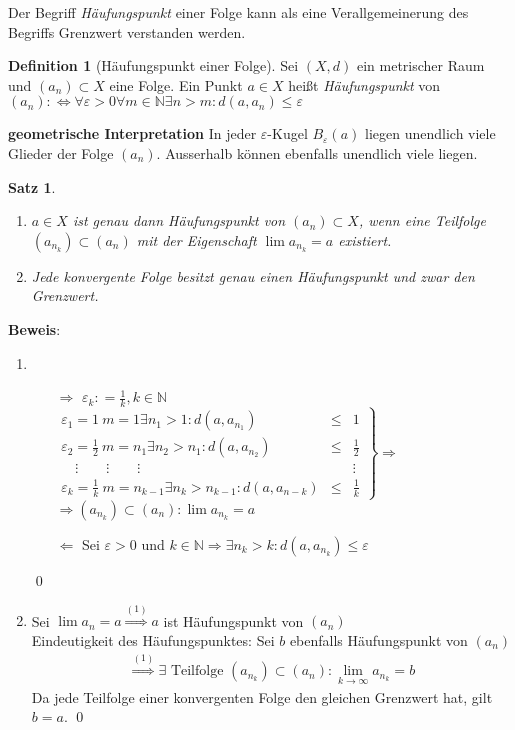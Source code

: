 \documentclass[ngerman,titlepage,twoside, parskip=half*]{scrreprt}
\newcommand*{\N}{\mathbb{N}}
\newcommand*{\perdef}{:\Leftrightarrow}
\theoremstyle{plain}
\newtheorem{theorem}{Satz}[section]
\theoremstyle{definition}
\newtheorem{definition}{Definition}
\theoremstyle{remark}
\newcommand*{\coloneqq}{\mathrel{\mathop:}=}
\begin{document}
Der Begriff \emph{Häufungspunkt} einer Folge kann
als eine Verallgemeinerung des Begriffs Grenzwert verstanden werden.

\begin{definition}[Häufungspunkt einer Folge]
  Sei $(X,d)$ ein metrischer Raum und $(a_n) \subset X$ eine
  Folge. Ein Punkt $a \in X$ heißt
  \emph{Häufungspunkt} von $(a_n)
  \perdef \forall \varepsilon > 0 \forall m \in \N
  \exists n>m\colon d(a,a_n) \leq \varepsilon$
\end{definition}

\textbf{geometrische Interpretation} In jeder $\varepsilon$-Kugel
$B_\varepsilon (a)$ liegen unendlich viele Glieder der Folge
$(a_n)$. Ausserhalb können ebenfalls unendlich viele liegen.

\begin{theorem}
\label{satz:hp}
\begin{enumerate}
\item $a\in X$ ist genau dann Häufungspunkt von $(a_n) \subset X$,
  wenn eine Teilfolge $(a_{n_k})\subset (a_n)$ mit der Eigenschaft
  $\lim a_{n_k}=a$ existiert.
\item Jede konvergente Folge besitzt genau einen Häufungspunkt und
  zwar den Grenzwert.
\end{enumerate}
\end{theorem}

\textbf{Beweis}:
\begin{enumerate}
  \item
    \begin{itemize}
      \item[$\Rightarrow$] $\varepsilon_k\coloneqq\frac{1}{k}, k \in \N$\\
        $\left.
	\begin{array}{lll}
	  \varepsilon_1=1\ m=1 \exists n_1>1\colon d(a,a_{n_1}) & \leq & 1\\
	  \varepsilon_2=\frac{1}{2}\ m = n_1 \exists n_2 >n_1\colon
	  d(a,a_{n_2}) & \leq & \frac{1}{2}\\
	  \quad \vdots \qquad \vdots \qquad \vdots & & \vdots\\
	  \varepsilon_k=\frac{1}{k}\ m=n_{k-1} \exists n_k > n_{k-1}\colon
	  d(a,a_{n-k}) & \leq & \frac{1}{k}
	\end{array}
	\right\} \Rightarrow$\\
	$\Rightarrow (a_{n_k})\subset (a_n)\colon\lim a_{n_k}=a$
      \item[$\Leftarrow$] Sei $\varepsilon > 0$ und $k \in \N \Rightarrow \exists n_k>k\colon d(a,a_{n_k})\leq \varepsilon$
    \end{itemize}
    \qed
  \item Sei $\lim a_n =a \overset{(1)}{\Rightarrow} a$ ist Häufungspunkt von $(a_n)$\\
    Eindeutigkeit des Häufungspunktes: Sei $b$ ebenfalls Häufungspunkt von $(a_n)$
    \begin{gather*}\overset{(1)}{\Rightarrow} \exists \text{ Teilfolge } (a_{n_k})\subset (a_n)\colon\lim_{k\rightarrow \infty}a_{n_k}=b\end{gather*}
    Da jede Teilfolge einer konvergenten Folge den gleichen Grenzwert hat, gilt $b=a$. \qed
\end{enumerate}
\end{document}
